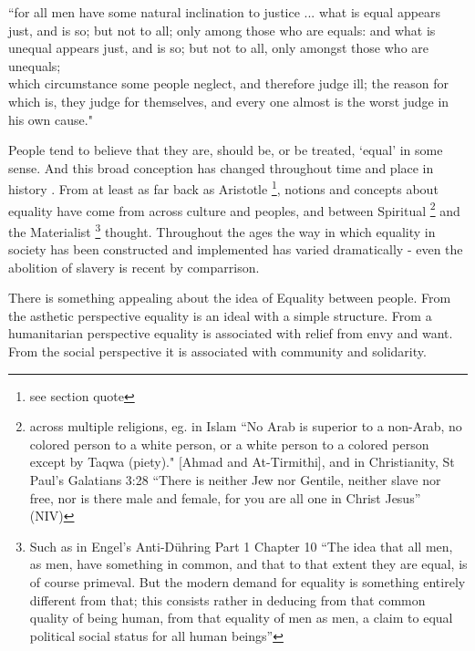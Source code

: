 \begin{displayquote}
``for all men have some natural inclination to justice ... what is equal appears just, and is so; but not to all; only among those who are equals: and what is unequal appears just, and is so; but not to all, only amongst those who are unequals;\\
which circumstance some people neglect, and therefore judge ill; the reason for which is, they judge for themselves, and every one almost is the worst judge in his own cause." \cite[Politics, chapter III.9]{AristotleGutenberg}
\end{displayquote}


People tend to believe that they are, should be, or be treated, `equal' in some sense.
And this broad conception has changed throughout time and place in history \cite{themeaningofequalitycapaldi}.
From at least as far back as Aristotle \cite{AristotleGutenberg}\footnote{see section quote}, notions and concepts about equality have come from across culture and peoples, and between Spiritual \footnote{across multiple religions, eg. in Islam ``No Arab is superior to a non-Arab, no colored person to a  white person, or a white person to a colored person except by Taqwa (piety)." [Ahmad and At-Tirmithi], and in Christianity, St Paul's Galatians 3:28 ``There is neither Jew nor Gentile, neither slave nor free, nor is there male and female, for you are all one in Christ Jesus'' (NIV) } and the Materialist \footnote{Such as in Engel's Anti-D\"{u}hring Part 1 Chapter 10 ``The idea that all men, as men, have something in common, and that to that extent they are equal, is of course primeval. But the modern demand for equality is something entirely different from that; this consists rather in deducing from that common quality of being human, from that equality of men as men, a claim to equal political social status for all human beings''} thought.
Throughout the ages the way in which equality in society has been constructed and implemented has varied dramatically - even the abolition of slavery is recent by comparrison.

There is something appealing about the idea of Equality between people.
From the asthetic perspective equality is an ideal with a simple structure. From a humanitarian perspective equality is associated with relief from envy and want. From the social perspective it is associated with community and solidarity.%

